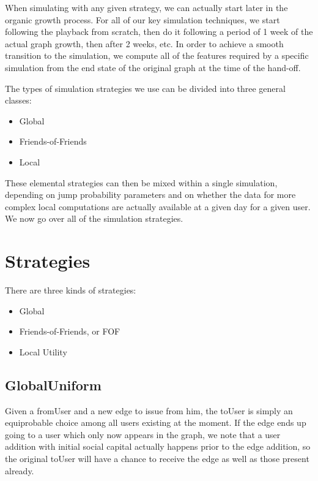 \documentclass[10pt,oneside]{memoir}
\begin{document}
When simulating with any given strategy, we can actually start later in the organic growth process.  For all of our key simulation techniques, we start following the playback from scratch, then do it following a period of 1 week of the actual graph growth, then after 2 weeks, etc.  In order to achieve a smooth transition to the simulation, we compute all of the features required by a specific simulation from the end state of the original graph at the time of the hand-off.


The types of simulation strategies we use can be divided into three general classes:


\begin{itemize}


\item Global

\item Friends-of-Friends

\item Local
\end{itemize}

These elemental strategies can then be mixed within a single simulation, depending on jump probability parameters and on whether the data for more complex local computations are actually available at a given day for a given user.  We now go over all of the simulation strategies.


\pagebreak \section{Strategies}
\label{strategies}

There are three kinds of strategies:


\begin{itemize}


\item Global

\item Friends-of-Friends, or FOF

\item Local Utility
\end{itemize}

\subsection{GlobalUniform}
\label{globaluniform}

Given a fromUser and a new edge to issue from him, the toUser is simply an equiprobable choice among all users existing at the moment.  If the edge ends up going to a user which only now appears in the graph, we note that a user addition with initial social capital actually happens prior to the edge addition, so the original toUser will have a chance to receive the edge as well as those present already.
\end{document}
